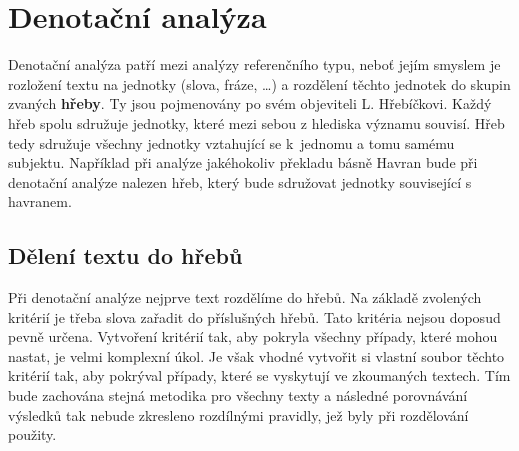 \documentclass[dp.tex]{subfiles}
\begin{document}
\chapter{Denotační analýza}
\label{chap:denotacni_analyza}

Denotační analýza patří mezi analýzy referenčního typu, neboť jejím smyslem je rozložení textu na jednotky (slova, fráze, \ldots) a rozdělení těchto jednotek do skupin zvaných \textbf{hřeby}. Ty jsou pojmenovány po svém objeviteli L. Hřebíčkovi. Každý hřeb spolu sdružuje jednotky, které mezi sebou z hlediska významu souvisí. Hřeb tedy sdružuje všechny jednotky vztahující se k~jednomu a tomu samému subjektu. Například při analýze jakéhokoliv překladu básně Havran bude při denotační analýze nalezen hřeb, který bude sdružovat jednotky související s havranem.

\section{Dělení textu do hřebů}

Při denotační analýze nejprve text rozdělíme do hřebů. Na základě zvolených kritérií je třeba slova zařadit do příslušných hřebů. Tato kritéria nejsou doposud pevně určena. Vytvoření kritérií tak, aby pokryla všechny případy, které mohou nastat, je velmi komplexní úkol. Je však vhodné vytvořit si vlastní soubor těchto kritérií tak, aby pokrýval případy, které se vyskytují ve zkoumaných textech. Tím bude zachována stejná metodika pro všechny texty a následné porovnávání výsledků tak nebude zkresleno rozdílnými pravidly, jež byly při rozdělování použity.
\end{document}
